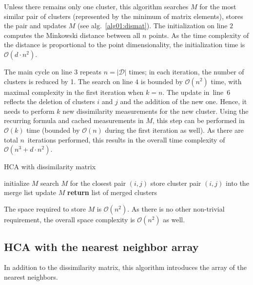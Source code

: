Unless there remains only one cluster, this algorithm searches $M$ for the most similar pair of clusters (represented by the minimum of matrix elements), stores the pair and updates $M$ (see alg.~\ref{alg01:dismat}). The initialization on line $2$ computes the Minkowski distance between all $n$ points. As the time complexity of the distance is proportional to the point dimensionality, the initialization time is $\mathcal{O}(d\cdot n^2)$.

The main cycle on line $3$ repeats $n = |\mathcal{D}|$ times; in each iteration, the number of clusters is reduced by 1. The search on line $4$ is bounded by $\mathcal{O}(n^2)$ time, with maximal complexity in the first iteration when $k=n$. The update in~line~$6$ reflects the deletion of clusters $i$ and $j$ and the addition of the new one. Hence, it needs to perform $k$ new dissimilarity measurements for the new cluster. Using the recurring formula and cached measurements in $M$, this step can be performed in $\mathcal{O}(k)$ time (bounded by $\mathcal{O}(n)$ during the first iteration as well). As there are total $n$~iterations performed, this results in the overall time complexity of $\mathcal{O}(n^3+d\cdot n^2)$. 

\begin{algorithm}[t]
	\caption{HCA with dissimilarity matrix}
	\label{alg01:dismat}
	\begin{algorithmic}[1]
		\State initialize $M$ 
		\State search $M$ for the closest pair $(i,j)$ 
		\State store cluster pair $(i,j)$ into the merge list 
		\State update $M$ 
		\EndFor
		\State \textbf{return} list of merged clusters
		\EndProcedure
	\end{algorithmic}
\end{algorithm}

The space required to store $M$ is $\mathcal{O}(n^2)$. As there is no other non-trivial requirement, the overall space complexity is $\mathcal{O}(n^2)$ as well.

\subsection{HCA with the nearest neighbor array}

In addition to the dissimilarity matrix, this algorithm introduces the array of the nearest neighbors.

